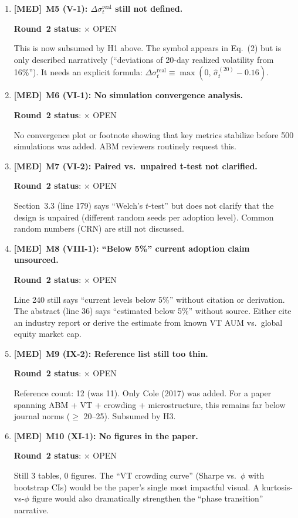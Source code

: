 \documentclass[12pt,a4paper]{article}
\newcommand{\MED}{\textbf{\textcolor{warncolor}{[MED]}}}
\newcommand{\OPEN}{\textcolor{errorred}{$\times$ OPEN}}
\begin{document}
\begin{enumerate}
\medskip

\item \MED\ \textbf{M5 (V-1): $\Delta\sigma^{\text{real}}_t$ still not defined.}

\textbf{Round~2 status}: \OPEN

This is now subsumed by H1 above. The symbol appears in Eq.~(2) but is only described narratively (``deviations of 20-day realized volatility from 16\%''). It needs an explicit formula: $\Delta\sigma^{\text{real}}_t \equiv \max(0,\, \hat{\sigma}^{(20)}_t - 0.16)$.

\medskip

\item \MED\ \textbf{M6 (VI-1): No simulation convergence analysis.}

\textbf{Round~2 status}: \OPEN

No convergence plot or footnote showing that key metrics stabilize before 500 simulations was added. ABM reviewers routinely request this.

\medskip

\item \MED\ \textbf{M7 (VI-2): Paired vs.\ unpaired t-test not clarified.}

\textbf{Round~2 status}: \OPEN

Section~3.3 (line 179) says ``Welch's $t$-test'' but does not clarify that the design is unpaired (different random seeds per adoption level). Common random numbers (CRN) are still not discussed.

\medskip

\item \MED\ \textbf{M8 (VIII-1): ``Below 5\%'' current adoption claim unsourced.}

\textbf{Round~2 status}: \OPEN

Line 240 still says ``current levels below 5\%'' without citation or derivation. The abstract (line 36) says ``estimated below 5\%'' without source. Either cite an industry report or derive the estimate from known VT AUM vs.\ global equity market cap.

\medskip

\item \MED\ \textbf{M9 (IX-2): Reference list still too thin.}

\textbf{Round~2 status}: \OPEN

Reference count: 12 (was 11). Only Cole (2017) was added. For a paper spanning ABM + VT + crowding + microstructure, this remains far below journal norms ($\geq$ 20--25). Subsumed by H3.

\medskip

\item \MED\ \textbf{M10 (XI-1): No figures in the paper.}

\textbf{Round~2 status}: \OPEN

Still 3 tables, 0 figures. The ``VT crowding curve'' (Sharpe vs.\ $\phi$ with bootstrap CIs) would be the paper's single most impactful visual. A kurtosis-vs-$\phi$ figure would also dramatically strengthen the ``phase transition'' narrative.

\end{enumerate}
\end{document}
